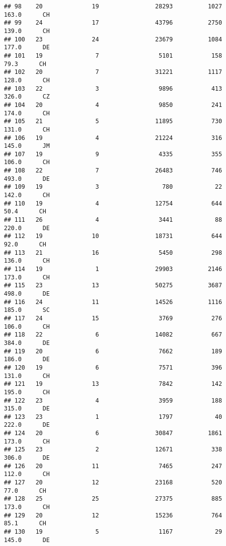 \documentclass[
]{article}
\begin{document}
\begin{verbatim}
## 98    20              19                28293          1027    163.0      CH
## 99    24              17                43796          2750    139.0      CH
## 100   23              24                23679          1084    177.0      DE
## 101   19               7                 5101           158     79.3      CH
## 102   20               7                31221          1117    128.0      CH
## 103   22               3                 9896           413    326.0      CZ
## 104   20               4                 9850           241    174.0      CH
## 105   21               5                11895           730    131.0      CH
## 106   19               4                21224           316    145.0      JM
## 107   19               9                 4335           355    106.0      CH
## 108   22               7                26483           746    493.0      DE
## 109   19               3                  780            22    142.0      CH
## 110   19               4                12754           644     50.4      CH
## 111   26               4                 3441            88    220.0      DE
## 112   19              10                18731           644     92.0      CH
## 113   21              16                 5450           298    136.0      CH
## 114   19               1                29903          2146    173.0      CH
## 115   23              13                50275          3687    498.0      DE
## 116   24              11                14526          1116    185.0      SC
## 117   24              15                 3769           276    106.0      CH
## 118   22               6                14082           667    384.0      DE
## 119   20               6                 7662           189    186.0      DE
## 120   19               6                 7571           396    131.0      CH
## 121   19              13                 7842           142    195.0      CH
## 122   23               4                 3959           188    315.0      DE
## 123   23               1                 1797            40    222.0      DE
## 124   20               6                30847          1861    173.0      CH
## 125   23               2                12671           338    306.0      DE
## 126   20              11                 7465           247    112.0      CH
## 127   20              12                23168           520     77.0      CH
## 128   25              25                27375           885    173.0      CH
## 129   20              12                15236           764     85.1      CH
## 130   19               5                 1167            29    145.0      DE

\end{verbatim}
\end{document}
